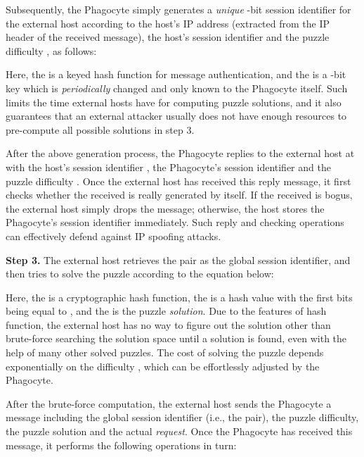 \documentclass[times,10pt,twocolumn]{article}
\begin{document}
Subsequently, the Phagocyte  simply generates a \emph{unique}
-bit session identifier  for the external host according
to the host's IP address  (extracted from the IP header of the
received message), the host's session identifier  and the
puzzle difficulty , as follows:




\noindent Here, the  is a keyed hash function for message
authentication, and the  is a -bit key which is
\emph{periodically} changed and only known to the Phagocyte itself.
Such  limits the time external hosts have for computing
puzzle solutions, and it also guarantees that an external attacker
usually does not have enough resources to pre-compute all possible
solutions in step 3.


After the above generation process, the Phagocyte replies to the
external host at  with the host's session identifier ,
the Phagocyte's session identifier  and the puzzle difficulty
. Once the external host has received this reply message, it
first checks whether the received  is really generated by
itself. If the received  is bogus, the external host simply
drops the message; otherwise, the host stores the Phagocyte's
session identifier  immediately. Such reply and checking
operations can effectively defend against IP spoofing attacks.





\textbf{Step 3.} The external host  retrieves the  pair as the global session identifier, and then tries
to solve the puzzle according to the equation below:



\noindent Here, the  is a cryptographic hash function, the  is a hash value with the first  bits being
equal to , and the  is the puzzle \emph{solution}. Due to the
features of hash function, the external host has no way to figure
out the solution other than brute-force searching the solution space
until a solution is found, even with the help of many other solved
puzzles. The cost of solving the puzzle depends exponentially on the
difficulty , which can be effortlessly adjusted by the Phagocyte.

After the brute-force computation, the external host sends the
Phagocyte a message including the global session identifier (i.e.,
the  pair), the puzzle difficulty, the
puzzle solution and the actual \emph{request}. Once the Phagocyte
has received this message, it performs the following operations in
turn:
\end{document}
